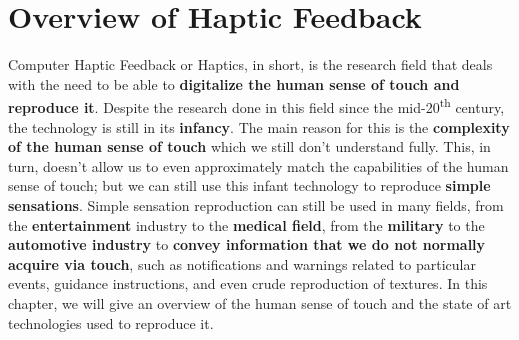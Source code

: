 
\chapter{Overview of Haptic Feedback} %

\label{Chapter3}

Computer Haptic Feedback or Haptics, in short, is the research field that deals with the need to be able to \textbf{digitalize the human sense of touch and reproduce it}. Despite the research done in this field since the mid-20\textsuperscript{th} century, the technology is still in its \textbf{infancy}. The main reason for this is the \textbf{complexity of the human sense of touch} which we still don't understand fully.
This, in turn, doesn't allow us to even approximately match the capabilities of the human sense of touch; but we can still use this infant technology to reproduce \textbf{simple sensations}.
Simple sensation reproduction can still be used in many fields, from the \textbf{entertainment} industry to the \textbf{medical field}, from the \textbf{military} to the \textbf{automotive industry} to \textbf{convey information that we do not normally acquire via touch}, such as notifications and warnings related to particular events, guidance instructions, and even crude reproduction of textures.
In this chapter, we will give an overview of the human sense of touch and the state of art technologies used to reproduce it.





